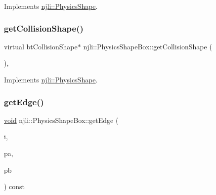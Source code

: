 Implements \mbox{\hyperlink{classnjli_1_1_physics_shape_a527e956caca24bf16ed0d47f69ff14e8}{njli\+::\+Physics\+Shape}}.

\mbox{\label{classnjli_1_1_physics_shape_box_a3d4319affdfb39571fa631ae31317b57}} 
\subsubsection{\texorpdfstring{get\+Collision\+Shape()}{getCollisionShape()}\hspace{0.1cm}{\footnotesize\ttfamily [2/2]}}
{\footnotesize\ttfamily virtual bt\+Collision\+Shape$\ast$ njli\+::\+Physics\+Shape\+Box\+::get\+Collision\+Shape (\begin{DoxyParamCaption}{ }\end{DoxyParamCaption})\hspace{0.3cm}{\ttfamily [protected]}, {\ttfamily [virtual]}}



Implements \mbox{\hyperlink{classnjli_1_1_physics_shape_a2910f0362035c971f245349a55378b01}{njli\+::\+Physics\+Shape}}.

\mbox{\label{classnjli_1_1_physics_shape_box_adacd48a8deac2b0469f79372c5637170}} 
\subsubsection{\texorpdfstring{get\+Edge()}{getEdge()}}
{\footnotesize\ttfamily \mbox{\hyperlink{_thread_8h_af1e856da2e658414cb2456cb6f7ebc66}{void}} njli\+::\+Physics\+Shape\+Box\+::get\+Edge (\begin{DoxyParamCaption}\item[{int}]{i,  }\item[{bt\+Vector3 \&}]{pa,  }\item[{bt\+Vector3 \&}]{pb }\end{DoxyParamCaption}) const\hspace{0.3cm}{\ttfamily [virtual]}}

